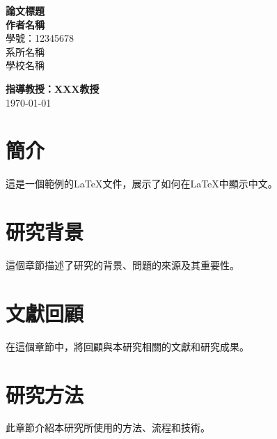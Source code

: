 \documentclass[12pt,a4paper]{report}
\begin{document}
\begin{titlepage}
    \centering
    \vspace*{1in}

    {\LARGE \textbf{論文標題}}\\[2cm]

    \textbf{作者名稱}\\
    學號：12345678\\
    系所名稱\\
    學校名稱\\[2cm]

    \vfill

    \textbf{指導教授：XXX教授}\\[3cm]

    \today\\

    \vspace*{1cm}
\end{titlepage}

\clearpage %



\chapter*{簡介} %
\vspace{-1cm} %
這是一個範例的LaTeX文件，展示了如何在LaTeX中顯示中文。

\chapter*{研究背景} %
\vspace{-1cm} %
這個章節描述了研究的背景、問題的來源及其重要性。

\chapter*{文獻回顧} %
\vspace{-1cm} %
在這個章節中，將回顧與本研究相關的文獻和研究成果。

\chapter*{研究方法} %
\vspace{-1cm} %
此章節介紹本研究所使用的方法、流程和技術。
\end{document}

